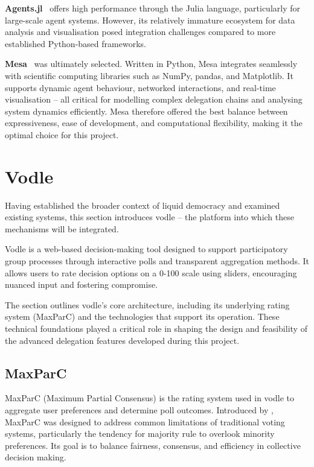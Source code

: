 \textbf{Agents.jl}~\citep{agentsjl} offers high performance through the Julia language, particularly for large-scale agent systems. However, its relatively immature ecosystem for data analysis and visualisation posed integration challenges compared to more established Python-based frameworks.

\textbf{Mesa}~\citep{kazil_utilizing_2020} was ultimately selected. Written in Python, Mesa integrates seamlessly with scientific computing libraries such as NumPy, pandas, and Matplotlib. It supports dynamic agent behaviour, networked interactions, and real-time visualisation -- all critical for modelling complex delegation chains and analysing system dynamics efficiently. Mesa therefore offered the best balance between expressiveness, ease of development, and computational flexibility, making it the optimal choice for this project.

\section{Vodle}
Having established the broader context of liquid democracy and examined existing systems, this section introduces vodle -- the platform into which these mechanisms will be integrated.

Vodle is a web-based decision-making tool designed to support participatory group processes through interactive polls and transparent aggregation methods. It allows users to rate decision options on a 0-100 scale using sliders, encouraging nuanced input and fostering compromise.

The section outlines vodle's core architecture, including its underlying rating system (MaxParC) and the technologies that support its operation. These technical foundations played a critical role in shaping the design and feasibility of the advanced delegation features developed during this project.

\subsection{MaxParC}\label{subsec:background_maxparc}
MaxParC (Maximum Partial Consensus) is the rating system used in vodle to aggregate user preferences and determine poll outcomes. Introduced by \citet{heitzig_fair_2024}, MaxParC was designed to address common limitations of traditional voting systems, particularly the tendency for majority rule to overlook minority preferences. Its goal is to balance fairness, consensus, and efficiency in collective decision making.

